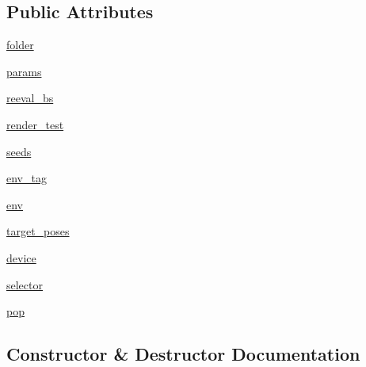\subsection*{Public Attributes}
\begin{DoxyCompactItemize}
\item 
\hyperlink{classtest__control_1_1_eval_ab7bbe970b739ab4e4c50eaddcc9dcf3a}{folder}
\item 
\hyperlink{classtest__control_1_1_eval_aa448ed9c10bcf735912c33165fb13918}{params}
\item 
\hyperlink{classtest__control_1_1_eval_a9b41dd8445a9a2067a0c1c1c643e96a6}{reeval\+\_\+bs}
\item 
\hyperlink{classtest__control_1_1_eval_a71aaa37227ff6276d6488c797e5a5820}{render\+\_\+test}
\item 
\hyperlink{classtest__control_1_1_eval_a8a5bcba911170d8f1863f18e9c70753b}{seeds}
\item 
\hyperlink{classtest__control_1_1_eval_a5faa1556cf278a857b7776ac65070a9d}{env\+\_\+tag}
\item 
\hyperlink{classtest__control_1_1_eval_a5427e13d8f47803a3f432b3534e5b372}{env}
\item 
\hyperlink{classtest__control_1_1_eval_a607d2a335587c88ed5501a7496f28c0a}{target\+\_\+poses}
\item 
\hyperlink{classtest__control_1_1_eval_a3bb981a22dd23d4ea59e8a7710605b05}{device}
\item 
\hyperlink{classtest__control_1_1_eval_a45b2a98522b490446543404b549772a5}{selector}
\item 
\hyperlink{classtest__control_1_1_eval_a49bff906981511f4b69ef63d37c02d0f}{pop}
\end{DoxyCompactItemize}


\subsection{Constructor \& Destructor Documentation}
